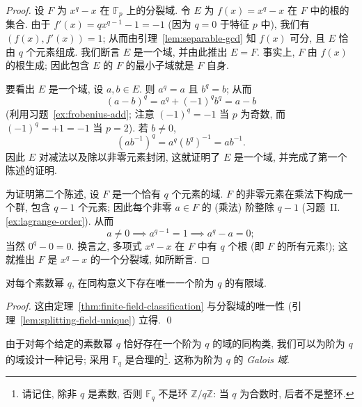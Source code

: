 \begin{proof}
设 $F$ 为 $x^q-x$ 在 $\mathbb{F}_p$ 上的分裂域. 令 $E$ 为 $f(x)=x^q-x$ 在 $F$ 中的根的集合. 由于 $f'(x)=qx^{q-1}-1=-1$ (因为 $q=0$ 于特征 $p$ 中), 我们有 $(f(x),f'(x))=1$; 从而由引理~\ref{lem:separable-gcd} 知 $f(x)$ 可分, 且 $E$ 恰由 $q$ 个元素组成. 我们断言 $E$ 是一个域, 并由此推出 $E=F$. 事实上, $F$ 由 $f(x)$ 的根生成; 因此包含 $E$ 的 $F$ 的最小子域就是 $F$ 自身.

要看出 $E$ 是一个域, 设 $a,b\in E$. 则 $a^q=a$ 且 $b^q=b$; 从而
\[
(a-b)^q=a^q+(-1)^qb^q=a-b
\]
(利用习题~\ref{ex:frobenius-add}; 注意 $(-1)^q=-1$ 当 $p$ 为奇数, 而 $(-1)^q=+1=-1$ 当 $p=2$). 若 $b\neq 0$,
\[
(ab^{-1})^q=a^q(b^q)^{-1}=ab^{-1}.
\]
因此 $E$ 对减法以及除以非零元素封闭, 这就证明了 $E$ 是一个域, 并完成了第一个陈述的证明.

为证明第二个陈述, 设 $F$ 是一个恰有 $q$ 个元素的域. $F$ 的非零元素在乘法下构成一个群, 包含 $q-1$ 个元素; 因此每个非零 $a\in F$ 的 (乘法) 阶整除 $q-1$ (习题~II.\ref{ex:lagrange-order}). 从而
\[
a\neq 0\implies a^{q-1}=1\implies a^q-a=0;
\]
当然 $0^q-0=0$. 换言之, 多项式 $x^q-x$ 在 $F$ 中有 $q$ 个根 (即 $F$ 的所有元素!); 这就推出 $F$ 是 $x^q-x$ 的一个分裂域, 如所断言.
\end{proof}

\begin{corollary}\label{cor:unique-finite-field}
对每个素数幂 $q$, 在同构意义下存在唯一一个阶为 $q$ 的有限域.
\end{corollary}

\begin{proof}
这由定理~\ref{thm:finite-field-classification} 与分裂域的唯一性 (引理~\ref{lem:splitting-field-unique}) 立得. \qed
\end{proof}

由于对每个给定的素数幂 $q$ 恰好存在一个阶为 $q$ 的域的同构类, 我们可以为阶为 $q$ 的域设计一种记号; 采用 $\mathbb{F}_q$ 是合理的\footnote{请记住, 除非 $q$ 是素数, 否则 $\mathbb F_q$ 不是环 $\mathbb Z/q\mathbb Z$: 当 $q$ 为合数时, 后者不是整环.}. 这称为阶为 $q$ 的 \emph{Galois 域}.

